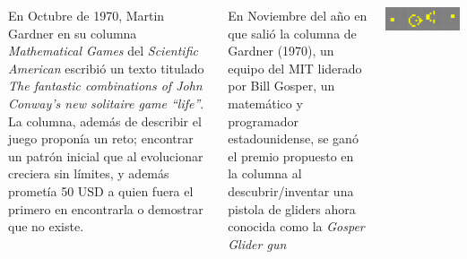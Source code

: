 \documentclass[20pt,margin=2.2cm,innermargin=-4.5in,blockverticalspace=-0.25in]{tikzposter}
\begin{document}
\begin{columns}
{        \vspace{5mm}
        En Octubre de 1970, Martin Gardner en su columna \textit{Mathematical Games} del \textit{Scientific American} \cite{Gardner1970} escribi\'o un texto titulado \textit{The fantastic combinations of John Conway's new solitaire game ``life''}. La columna, adem\'as de describir el juego propon\'ia un reto; encontrar un patr\'on inicial que al evolucionar creciera sin l\'imites, y adem\'as promet\'ia 50 USD a quien fuera el primero en encontrarla o demostrar que no existe.

        En Noviembre del a\~no en que sali\'o la columna de Gardner (1970), un equipo del MIT liderado por Bill Gosper, un matem\'atico y programador estadounidense, se gan\'o el premio propuesto en la columna al descubrir/inventar una pistola de gliders ahora conocida como la \textit{Gosper Glider gun}
        \vspace{7mm}

        \begin{minipage}[t]{\linewidth}
            \centering
            \includegraphics[width=.8\textwidth]{images/life-gosper-gun.png}
        \end{minipage}

    }
    

    
    

    

\end{columns}
\end{document}
